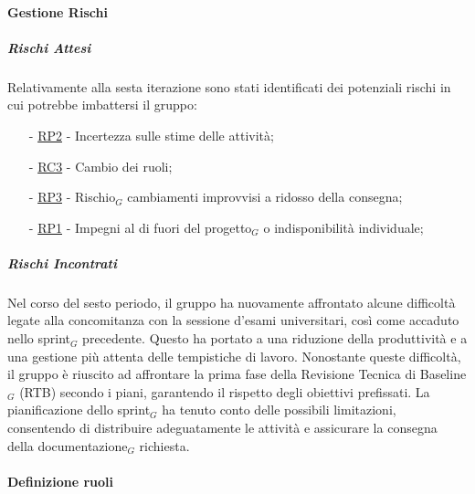 \documentclass[10pt]{article}
\begin{document}
{{{{{{{\begin{itemize}
    \end{itemize}

    \paragraph{Gestione Rischi}\mbox{}
    \vspace{-1em}
    \subparagraph*{Rischi Attesi}\mbox{}
    
    Relativamente alla sesta iterazione sono stati identificati dei potenziali rischi in cui potrebbe imbattersi il gruppo:
    \vspace{-0.5em}
    \begin{itemize}
    \setlength\itemsep{-0.2em}
    \item [-] \hyperref[RP2]{RP2} - Incertezza sulle stime delle attività;
    \item [-] \hyperref[RC3]{RC3} - Cambio dei ruoli;
    \item [-] \hyperref[RP3]{RP3} - Rischio$_G$ cambiamenti improvvisi a ridosso della consegna;
    \item [-] \hyperref[RP1]{RP1} - Impegni al di fuori del progetto$_G$ o indisponibilità individuale;

    \end{itemize}

    \subparagraph*{Rischi Incontrati}\mbox{}
    
    Nel corso del sesto periodo, il gruppo ha nuovamente affrontato alcune difficoltà legate alla concomitanza con la sessione d'esami universitari, così come accaduto nello sprint$_G$ precedente. Questo ha portato a una riduzione della produttività e a una gestione più attenta delle tempistiche di lavoro.  
Nonostante queste difficoltà, il gruppo è riuscito ad affrontare la prima fase della Revisione Tecnica di Baseline$_G$ (RTB) secondo i piani, garantendo il rispetto degli obiettivi prefissati. La pianificazione dello sprint$_G$ ha tenuto conto delle possibili limitazioni, consentendo di distribuire adeguatamente le attività e assicurare la consegna della documentazione$_G$ richiesta.

    \paragraph{Definizione ruoli}\mbox{}\vspace{0.4em}
    
}}}}}}}
\end{document}
